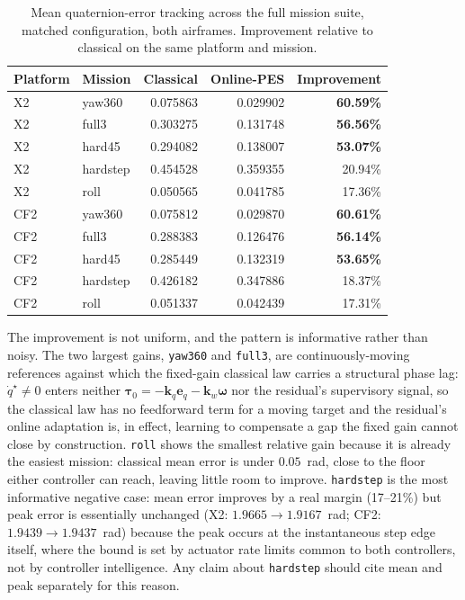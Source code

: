 \documentclass[10pt,twocolumn]{article}
\begin{document}
\begin{table}[t]
\centering
\caption{Mean quaternion-error tracking across the full mission suite,
matched configuration, both airframes. Improvement relative to classical
on the same platform and mission.}
\label{tab:missions}
\small
\begin{tabular}{llrrr}
\toprule
Platform & Mission & Classical & Online-PES & Improvement \\
\midrule
X2  & yaw360   & 0.075863 & 0.029902 & \textbf{60.59\%} \\
X2  & full3    & 0.303275 & 0.131748 & \textbf{56.56\%} \\
X2  & hard45   & 0.294082 & 0.138007 & \textbf{53.07\%} \\
X2  & hardstep & 0.454528 & 0.359355 & 20.94\% \\
X2  & roll     & 0.050565 & 0.041785 & 17.36\% \\
\midrule
CF2 & yaw360   & 0.075812 & 0.029870 & \textbf{60.61\%} \\
CF2 & full3    & 0.288383 & 0.126476 & \textbf{56.14\%} \\
CF2 & hard45   & 0.285449 & 0.132319 & \textbf{53.65\%} \\
CF2 & hardstep & 0.426182 & 0.347886 & 18.37\% \\
CF2 & roll     & 0.051337 & 0.042439 & 17.31\% \\
\bottomrule
\end{tabular}
\end{table}

The improvement is not uniform, and the pattern is informative rather than
noisy. The two largest gains, \texttt{yaw360} and \texttt{full3}, are
continuously-moving references against which the fixed-gain classical law
carries a structural phase lag: $\dot q^\star \neq 0$ enters neither
$\bm\tau_0=-\bm k_q\bm e_q-\bm k_w\bm\omega$ nor the residual's supervisory
signal, so the classical law has no feedforward term for a moving target and
the residual's online adaptation is, in effect, learning to compensate a gap
the fixed gain cannot close by construction. \texttt{roll} shows the smallest
relative gain because it is already the easiest mission: classical mean error
is under $0.05$~rad, close to the floor either controller can reach, leaving
little room to improve. \texttt{hardstep} is the most informative negative
case: mean error improves by a real margin (17--21\%) but peak error is
essentially unchanged (X2: $1.9665\rightarrow1.9167$~rad; CF2:
$1.9439\rightarrow1.9437$~rad) because the peak occurs at the instantaneous
step edge itself, where the bound is set by actuator rate limits common to
both controllers, not by controller intelligence. Any claim about
\texttt{hardstep} should cite mean and peak separately for this reason.
\end{document}

